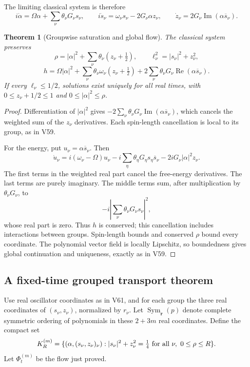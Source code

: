 \documentclass[11pt]{article}
\newtheorem{theorem}{Theorem}[section]
\theoremstyle{remark}
\begin{document}
The limiting classical system is therefore
\[
 i\dot\alpha=\Omega\alpha+\sum_\nu\theta_\nu G_\nu s_\nu,
 \qquad
 i\dot s_\nu=\omega_\nu s_\nu-2G_\nu\alpha z_\nu,
 \qquad
 \dot z_\nu=2G_\nu\operatorname{Im}(\alpha\overline s_\nu).
\]

\begin{theorem}[Groupwise saturation and global flow]
\label{thm:v20v62-flow}
The classical system preserves
\[
 \rho=|\alpha|^2+\sum_\nu\theta_\nu(z_\nu+\tfrac12),
 \qquad \ell_\nu^2=|s_\nu|^2+z_\nu^2,
\]
\[
 h=\Omega|\alpha|^2+
       \sum_\nu\theta_\nu\omega_\nu(z_\nu+\tfrac12)
       +2\sum_\nu\theta_\nu G_\nu
                           \operatorname{Re}(\alpha\overline s_\nu).
\]
If every \(\ell_\nu\leq1/2\), solutions exist uniquely
for all real times, with \(0\leq z_\nu+1/2\leq1\)
and \(0\leq|\alpha|^2\leq\rho\).
\end{theorem}
\begin{proof}
Differentiation of \(|\alpha|^2\) gives
\(-2\sum_\nu\theta_\nu G_\nu
\operatorname{Im}(\alpha\overline s_\nu)\),
which cancels the weighted sum of the \(z_\nu\) derivatives.
Each spin-length cancellation is local to its group,
as in V59.

For the energy, put \(u_\nu=\alpha\overline s_\nu\).
Then
\[
 \dot u_\nu=i(\omega_\nu-\Omega)u_\nu
       -i\sum_\eta\theta_\eta G_\eta s_\eta\overline s_\nu
       -2iG_\nu|\alpha|^2z_\nu .
\]
The first terms in the weighted real part cancel the
free-energy derivatives.  The last terms are purely
imaginary.  The middle terms sum, after multiplication
by \(\theta_\nu G_\nu\), to
\[
 -i\left|\sum_\nu\theta_\nu G_\nu s_\nu\right|^2,
\]
whose real part is zero.  Thus \(h\) is conserved;
this cancellation includes interactions between groups.
Spin-length bounds and conserved \(\rho\) bound every
coordinate.  The polynomial vector field is locally
Lipschitz, so boundedness gives global continuation and
uniqueness, exactly as in V59.
\end{proof}

\subsection{A fixed-time grouped transport theorem}

Use real oscillator coordinates as in V61, and for
each group the three real coordinates of
\((s_\nu,z_\nu)\), normalized by \(r_\nu\).
Let \(\operatorname{Sym}_{\boldsymbol r}(p)\) denote
complete symmetric ordering of polynomials in these
\(2+3m\) real coordinates.  Define the compact set
\[
 K_R^{(m)}=\{(\alpha,(s_\nu,z_\nu)_\nu):
       |s_\nu|^2+z_\nu^2=\tfrac14\ \hbox{for all }\nu,\
                      0\leq\rho\leq R\}.
\]
Let \(\Phi_t^{(m)}\) be the flow just proved.
\end{document}
